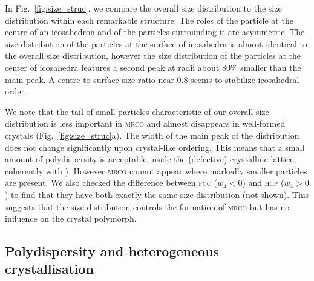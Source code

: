 \documentclass[8.5pt,twoside,twocolumn]{article}
\begin{document}
In Fig.~\ref{fig:size_struc}, we compare the overall size distribution to the size distribution within each remarkable structure. The roles of the particle at the centre of an icosahedron and of the particles surrounding it are asymmetric. The size distribution of the particles at the surface of icosahedra is almost identical to the overall size distribution, however the size distribution of the particles at the center of icosahedra features a second peak at radii about $80\%$ smaller than the main peak. A centre to surface size ratio near $0.8$ seems to stabilize icosahedral order.

We note that the tail of small particles characteristic of our overall size distribution is less important in \textsc{mrco} and almost disappears in well-formed crystals (Fig.~\ref{fig:size_struc}a). The width of the main peak of the distribution does not change significantly upon crystal-like ordering. This means that a small amount of polydispersity is acceptable inside the (defective) crystalline lattice, coherently with \citet{Fasolo2003}). However \textsc{mrco} cannot appear where markedly smaller particles are present. We also checked the difference between \textsc{fcc} ($w_4<0$) and \textsc{hcp} ($w_4>0$) to find that they have both exactly the same size distribution (not shown). This suggests that the size distribution controls the formation of \textsc{mrco} but has no influence on the crystal polymorph.

\subsection{Polydispersity and heterogeneous crystallisation}
\end{document}

